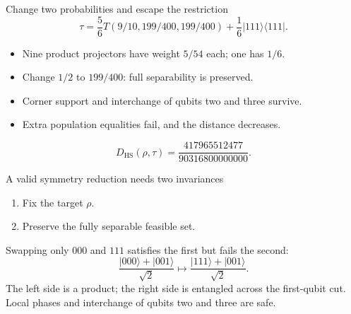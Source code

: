 \documentclass{beamer}
\begin{document}
\begin{frame}{Change two probabilities and escape the restriction}
\[
\tau=\frac56T(9/10,199/400,199/400)+\frac16|111\rangle\langle111|.
\]
\begin{itemize}
\item Nine product projectors have weight $5/54$ each; one has $1/6$.
\item Change $1/2$ to $199/400$: full separability is preserved.
\item Corner support and interchange of qubits two and three survive.
\item Extra population equalities fail, and the distance decreases.
\end{itemize}
\[
D_{\mathrm{HS}}(\rho,\tau)=\frac{417965512477}{90316800000000}.
\]
\end{frame}
\begin{frame}{A valid symmetry reduction needs two invariances}
\begin{enumerate}
\item Fix the target $\rho$.
\item Preserve the fully separable feasible set.
\end{enumerate}
Swapping only $000$ and $111$ satisfies the first but fails the second:
\[
\frac{|000\rangle+|001\rangle}{\sqrt2}
\longmapsto\frac{|111\rangle+|001\rangle}{\sqrt2}.
\]
The left side is a product; the right side is entangled across the first-qubit cut.
\medskip
Local phases and interchange of qubits two and three are safe.
\end{frame}
\end{document}
